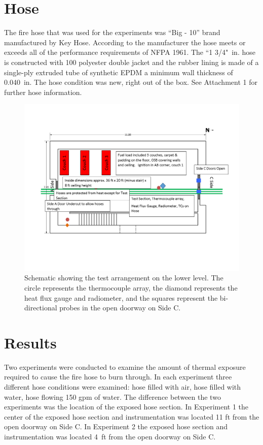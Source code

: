 \documentclass[letterpaper,11pt]{texMemo} %
\begin{document}
\section{Hose}
The fire hose that was used for the experiments was ``Big - 10'' brand manufactured by Key Hose. According to the manufacturer the hose meets or exceeds all of the performance requirements of NFPA 1961. The ``1 3/4"~in. hose is constructed with 100 polyester double jacket and the rubber lining is made of a single-ply extruded tube of synthetic EPDM a minimum wall thickness of 0.040~in. The hose condition was new, right out of the box. See Attachment 1 for further hose information.

\begin{figure}[!ht]
\centering
\includegraphics[width=.8\columnwidth]{../Figures/Hose_Figures/test_plan}
\caption{Schematic showing the test arrangement on the lower level. The circle represents the thermocouple array, the diamond represents the heat flux gauge and radiometer, and the squares represent the bi-directional probes in the open doorway on Side C.}
\label{fig:test_plan}
\end{figure}

\section{Results}
Two experiments were conducted to examine the amount of thermal exposure required to cause the fire hose to burn through. In each experiment three different hose conditions were examined: hose filled with air, hose filled with water, hose flowing 150 gpm of water. The difference between the two experiments was the location of the exposed hose section. In Experiment 1 the center of the exposed hose section and instrumentation was located 11 ft from the open doorway on Side C. In Experiment 2 the exposed hose section and instrumentation was located 4~ft from the open doorway on Side C.  
\end{document}
